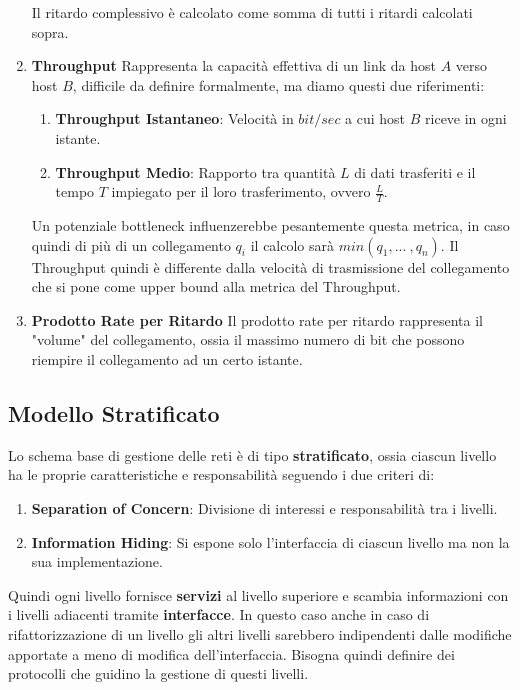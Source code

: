 \documentclass{article}
\begin{document}
\begin{enumerate}
    Il ritardo complessivo è calcolato come somma di tutti i ritardi calcolati sopra.

\newpage

    \item \textbf{Throughput}
    Rappresenta la capacità effettiva di un link da host $A$ verso host $B$, difficile da definire formalmente, ma diamo questi due riferimenti:

    \begin{enumerate}
        \item \textbf{Throughput Istantaneo}: Velocità in $bit/sec$ a cui host $B$ riceve in ogni istante.
        \item \textbf{Throughput Medio}: Rapporto tra quantità $L$ di dati trasferiti e il tempo $T$ impiegato per il loro trasferimento, ovvero $\frac{L}{T}$.
    \end{enumerate}

    Un potenziale bottleneck influenzerebbe pesantemente questa metrica, in caso quindi di più di un collegamento $q_{i}$ il calcolo sarà $min(q_{1}, ...\:, q_{n})$.
    Il Throughput quindi è differente dalla velocità di trasmissione del collegamento che si pone come upper bound alla metrica del Throughput.

    \item \textbf{Prodotto Rate per Ritardo}
    Il prodotto rate per ritardo rappresenta il "volume" del collegamento, ossia il massimo numero di bit che possono riempire il collegamento ad
    un certo istante.

\end{enumerate}

\subsection{Modello Stratificato}

Lo schema base di gestione delle reti è di tipo \textbf{stratificato}, ossia ciascun livello ha le proprie caratteristiche e responsabilità
seguendo i due criteri di:

\begin{enumerate}
    \item \textbf{Separation of Concern}: Divisione di interessi e responsabilità tra i livelli.
    \item \textbf{Information Hiding}: Si espone solo l'interfaccia di ciascun livello ma non la sua implementazione.
\end{enumerate}

Quindi ogni livello fornisce \textbf{servizi} al livello superiore e scambia informazioni con i livelli adiacenti tramite \textbf{interfacce}.
In questo caso anche in caso di rifattorizzazione di un livello gli altri livelli sarebbero indipendenti dalle modifiche apportate a meno di modifica dell'interfaccia.
Bisogna quindi definire dei protocolli che guidino la gestione di questi livelli.
\end{document}
